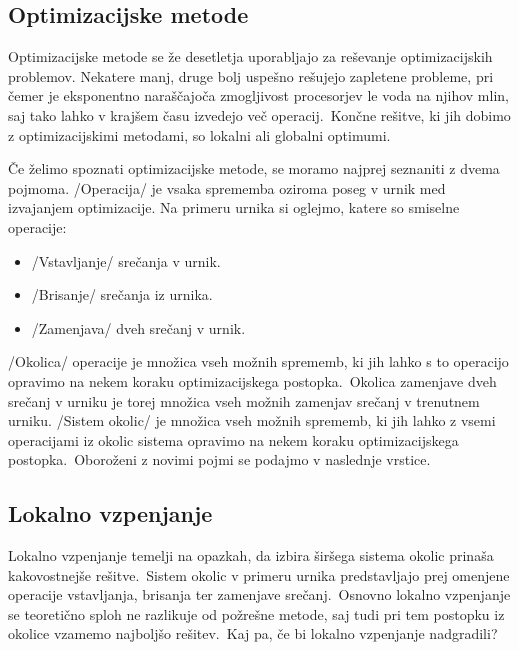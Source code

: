 \documentclass[a4paper,10pt]{article}
\begin{document}
\subsection{Optimizacijske metode} %

Optimizacijske metode se že desetletja uporabljajo za reševanje optimizacijskih problemov.
Nekatere manj, druge bolj uspešno rešujejo zapletene probleme, pri čemer je eksponentno
naraščajoča zmogljivost procesorjev le voda na njihov mlin, saj tako lahko v krajšem
času izvedejo več operacij.\ Končne rešitve, ki jih dobimo z optimizacijskimi metodami,
so lokalni ali globalni optimumi.

Če želimo spoznati optimizacijske metode, se moramo najprej seznaniti z dvema pojmoma.
/Operacija/ je vsaka sprememba oziroma poseg v urnik med izvajanjem optimizacije.
Na primeru urnika si oglejmo, katere so smiselne operacije:

   \begin{itemize}
	\item /Vstavljanje/ srečanja v urnik.
   \item /Brisanje/ srečanja iz urnika.
   \item /Zamenjava/ dveh srečanj v urnik.
\end{itemize}

/Okolica/ operacije je množica vseh možnih sprememb, ki jih lahko s to operacijo
opravimo na nekem koraku optimizacijskega postopka.\ Okolica zamenjave dveh srečanj v urniku
je torej množica vseh možnih zamenjav srečanj v trenutnem urniku.
%
/Sistem okolic/ je množica vseh možnih sprememb, ki jih lahko z vsemi operacijami iz
okolic sistema opravimo na nekem koraku optimizacijskega postopka.\ Oboroženi z novimi pojmi
se podajmo v naslednje vrstice.

\subsection{Lokalno vzpenjanje} %

Lokalno vzpenjanje temelji na opazkah, da izbira širšega sistema okolic prinaša kakovostnejše
rešitve.\ Sistem okolic v primeru urnika predstavljajo prej omenjene operacije vstavljanja,
brisanja ter zamenjave srečanj.\ Osnovno lokalno vzpenjanje se teoretično sploh ne razlikuje
od požrešne metode, saj tudi pri tem postopku iz okolice vzamemo najboljšo rešitev.\ Kaj pa,
če bi lokalno vzpenjanje nadgradili?
\end{document}
